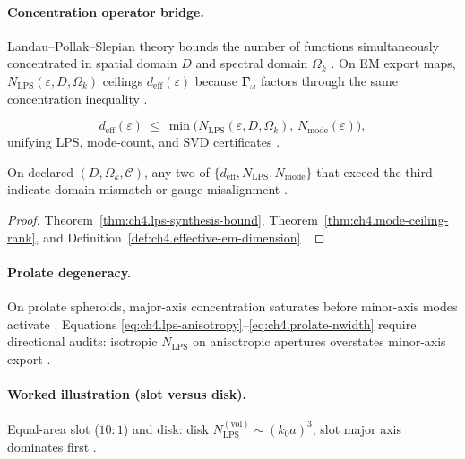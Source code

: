 
\paragraph{Concentration operator bridge.}
Landau--Pollak--Slepian theory bounds the number of functions simultaneously concentrated in spatial domain \(D\) and spectral domain \(\Omega_{k}\)
\cite{hansen1988,stratton1941}. On EM export maps, \(N_{\mathrm{LPS}}(\varepsilon,D,\Omega_{k})\) ceilings \(d_{\mathrm{eff}}(\varepsilon)\) because
\(\boldsymbol{\Gamma}_\omega\) factors through the same concentration inequality \cite{harrington2001,devaney2004,jackson1999}.

\begin{equation}
\label{eq:ch4.lps-export-bridge}
d_{\mathrm{eff}}(\varepsilon)\ \le\ \min\big(N_{\mathrm{LPS}}(\varepsilon,D,\Omega_{k}),\,N_{\mathrm{mode}}(\varepsilon)\big),
\end{equation}
unifying LPS, mode-count, and SVD certificates \cite{hansen1988,stratton1941,harrington2001}.

\begin{theorem}
\label{thm:ch4.triple-ceiling}
On declared \((D,\Omega_{k},\mathcal{C})\), any two of \(\{d_{\mathrm{eff}},N_{\mathrm{LPS}},N_{\mathrm{mode}}\}\) that exceed the third indicate
domain mismatch or gauge misalignment \cite{hansen1988,harrington2001,devaney2004,stratton1941}.
\end{theorem}
\begin{proof}
Theorem~\ref{thm:ch4.lps-synthesis-bound}, Theorem~\ref{thm:ch4.mode-ceiling-rank}, and Definition~\ref{def:ch4.effective-em-dimension}
\cite{stratton1941,hansen1988}.
\end{proof}

\paragraph{Prolate degeneracy.}
On prolate spheroids, major-axis concentration saturates before minor-axis modes activate \cite{hansen1988,jackson1999}. Equations
\eqref{eq:ch4.lps-anisotropy}--\eqref{eq:ch4.prolate-nwidth} require directional audits: isotropic \(N_{\mathrm{LPS}}\) on anisotropic apertures
overstates minor-axis export \cite{collin2001,harrington2001}.

\paragraph{Worked illustration (slot versus disk).}
Equal-area slot (\(10:1\)) and disk: disk \(N_{\mathrm{LPS}}^{(\mathrm{vol})}\sim(k_{0}a)^{3}\); slot major axis dominates first
\cite{hansen1988,collin2001,stratton1941}.

